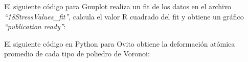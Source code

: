 El siguiente código para Gnuplot realiza un fit de los datos en el archivo \textit{``18StressValues\_fit''}, calcula el valor R cuadrado del fit y obtiene un gráfico \textit{``publication ready''}:



El siguiente código en Python para Ovito obtiene la deformación atómica promedio de cada tipo de poliedro de Voronoi:

